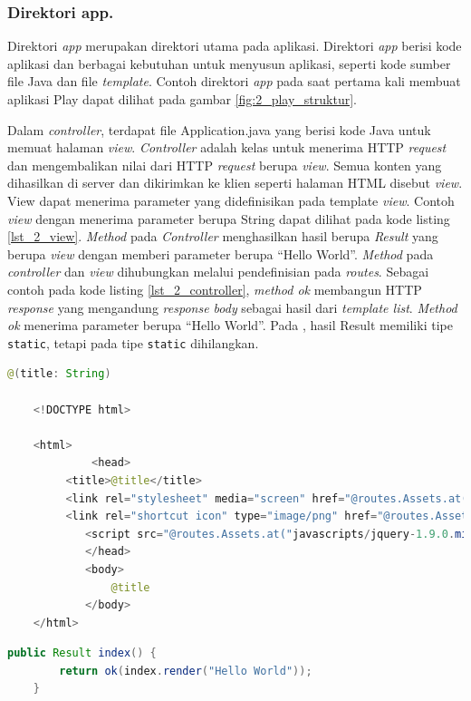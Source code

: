 \subsubsection{Direktori app.}
Direktori \textit{app} merupakan direktori utama pada aplikasi. Direktori \textit{app} berisi kode aplikasi dan berbagai kebutuhan untuk menyusun aplikasi, seperti kode sumber file Java dan file \textit{template}. Contoh direktori \textit{app} pada saat pertama kali membuat aplikasi Play dapat dilihat pada gambar \ref{fig:2_play_struktur}. 

Dalam \textit{controller}, terdapat file Application.java yang berisi kode Java untuk memuat halaman \textit{view}. \textit{Controller} adalah kelas untuk menerima HTTP \textit{request} dan mengembalikan nilai dari HTTP \textit{request} berupa \textit{view}. Semua konten yang dihasilkan di server dan dikirimkan ke klien seperti halaman HTML disebut \textit{view}. View dapat menerima parameter yang didefinisikan pada template \textit{view}. Contoh \textit{view} dengan menerima parameter berupa String dapat dilihat pada kode listing \ref{lst_2_view}. \textit{Method} pada \textit{Controller} menghasilkan hasil berupa \textit{Result} yang berupa \textit{view} dengan memberi parameter berupa ``Hello World''. \textit{Method} pada \textit{controller} dan \textit{view} dihubungkan melalui pendefinisian pada \textit{routes}. Sebagai contoh pada kode listing \ref{lst_2_controller}, \textit{method ok} membangun HTTP \textit{response} yang mengandung \textit{response body} sebagai hasil dari \textit{template list}. \textit{Method ok} menerima parameter berupa ``Hello World''. Pada \cite{playforjava}, hasil Result memiliki tipe \verb!static!, tetapi pada  tipe \verb!static! dihilangkan.

\begin{lstlisting}[caption=Contoh View (index.scala.html),label = {lst_2_view},language=Java]
@(title: String)

	<!DOCTYPE html>

	<html>
    		 <head>
       	 <title>@title</title>
       	 <link rel="stylesheet" media="screen" href="@routes.Assets.at("stylesheets/main.css")">
       	 <link rel="shortcut icon" type="image/png" href="@routes.Assets.at("images/favicon.png")">
        	<script src="@routes.Assets.at("javascripts/jquery-1.9.0.min.js")" type="text/javascript"></script>
    		</head>
    		<body>
        		@title
    		</body>
	</html>
\end{lstlisting}


\begin{lstlisting}[caption=Contoh Controller,label = {lst_2_controller},language=Java]
	public Result index() {
        return ok(index.render("Hello World"));
    }
\end{lstlisting}

